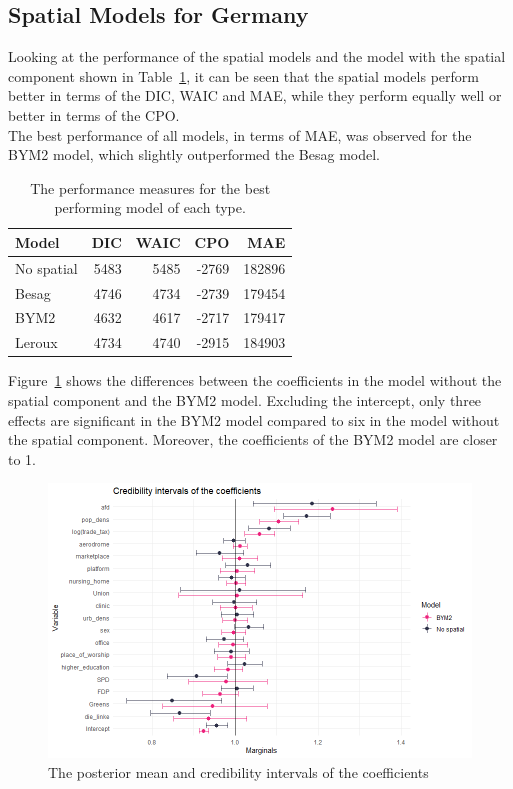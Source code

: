 \subsection{Spatial Models for Germany}
Looking at the performance of the spatial models and the model with the spatial component shown in Table~\ref{allGermany}, it can be seen that the spatial models perform better in terms of the DIC, WAIC and MAE, while they perform equally well or better in terms of the CPO. \\
The best performance of all models, in terms of MAE, was observed for the BYM2 model, which slightly outperformed the Besag model.
\begin{table}[H] 
\caption{The performance measures for the best performing model of each type. \label{allGermany}}
\begin{tabular}{l r r r r}
\toprule
\textbf{Model}	& \textbf{DIC}	& \textbf{WAIC} & \textbf{CPO} & \textbf{MAE}\\
\midrule
No spatial & 5483 & 5485 & -2769 & 182896 \\
Besag& 4746 & 4734 & -2739 & 179454\\
BYM2 & 4632 & 4617 & -2717 & 179417\\
Leroux & 4734 & 4740 & -2915 & 184903 \\
\bottomrule
\end{tabular}
\end{table}
Figure~\ref{intervalGermany} shows the differences between the coefficients in the model without the spatial component and the BYM2 model. Excluding the intercept, only three effects are significant in the BYM2 model compared to six in the model without the spatial component. Moreover, the coefficients of the BYM2 model are closer to 1. 
\begin{figure}[H]
  \centering
  \includegraphics[width = \textwidth]{intervals_germany.png}
  \caption{The posterior mean and credibility intervals of the coefficients}
  \label{intervalGermany}
\end{figure}
